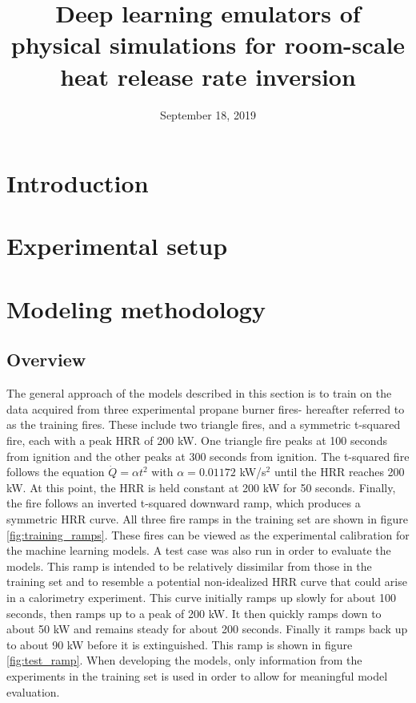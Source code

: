\documentclass{article}
\begin{document}
\title{Deep learning emulators of physical simulations for room-scale heat release rate inversion}
\author{}
\date{September 18, 2019}

\maketitle

\begin{abstract}

\end{abstract}




\section{Introduction}
\section{Experimental setup}





\section{Modeling methodology}
\subsection{Overview}

The general approach of the models described in this section is to train on the data acquired from three experimental propane burner fires- hereafter referred to as the training fires. These include two triangle fires, and a symmetric t-squared fire, each with a peak HRR of 200 kW. One triangle fire peaks at 100 seconds from ignition and the other peaks at 300 seconds from ignition. The t-squared fire follows the equation $\dot{Q} = \alpha t^2$ with $\alpha=0.01172$ kW/s$^2$ until the HRR reaches 200 kW. At this point, the HRR is held constant at 200 kW for 50 seconds. Finally, the fire follows an inverted t-squared downward ramp, which produces a symmetric HRR curve. All three fire ramps in the training set are shown in figure \ref{fig:training_ramps}. These fires can be viewed as the experimental calibration for the machine learning models. A test case was also run in order to evaluate the models. This ramp is intended to be relatively dissimilar from those in the training set and to resemble a potential non-idealized HRR curve that could arise in a calorimetry experiment. This curve initially ramps up slowly for about 100 seconds, then ramps up to a peak of 200 kW. It then quickly ramps down to about 50 kW and remains steady for about 200 seconds. Finally it ramps back up to about 90 kW before it is extinguished. This ramp is shown in figure \ref{fig:test_ramp}. When developing the models, only information from the experiments in the training set is used in order to allow for meaningful model evaluation.
\end{document}
